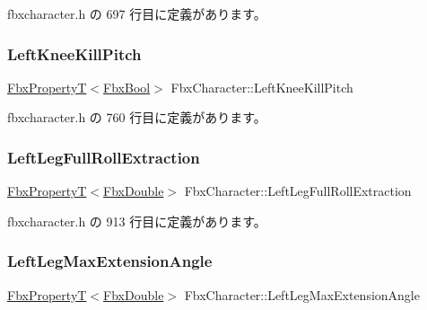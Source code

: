 fbxcharacter.\+h の 697 行目に定義があります。

\mbox{\label{class_fbx_character_afd58feb02aeb1bc42fc0e367e3a51404}} 
\subsubsection{\texorpdfstring{Left\+Knee\+Kill\+Pitch}{LeftKneeKillPitch}}
{\footnotesize\ttfamily \hyperlink{class_fbx_property_t}{Fbx\+PropertyT}$<$\hyperlink{fbxtypes_8h_a92e0562b2fe33e76a242f498b362262e}{Fbx\+Bool}$>$ Fbx\+Character\+::\+Left\+Knee\+Kill\+Pitch}



 fbxcharacter.\+h の 760 行目に定義があります。

\mbox{\label{class_fbx_character_aec7cb86bbe26ae7eed3e7e26f026221a}} 
\subsubsection{\texorpdfstring{Left\+Leg\+Full\+Roll\+Extraction}{LeftLegFullRollExtraction}}
{\footnotesize\ttfamily \hyperlink{class_fbx_property_t}{Fbx\+PropertyT}$<$\hyperlink{fbxtypes_8h_a171e72a1c46fc15c1a6c9c31948c1c5b}{Fbx\+Double}$>$ Fbx\+Character\+::\+Left\+Leg\+Full\+Roll\+Extraction}



 fbxcharacter.\+h の 913 行目に定義があります。

\mbox{\label{class_fbx_character_a27fc895d26ff251bc59c9758aef2e03f}} 
\subsubsection{\texorpdfstring{Left\+Leg\+Max\+Extension\+Angle}{LeftLegMaxExtensionAngle}}
{\footnotesize\ttfamily \hyperlink{class_fbx_property_t}{Fbx\+PropertyT}$<$\hyperlink{fbxtypes_8h_a171e72a1c46fc15c1a6c9c31948c1c5b}{Fbx\+Double}$>$ Fbx\+Character\+::\+Left\+Leg\+Max\+Extension\+Angle}



